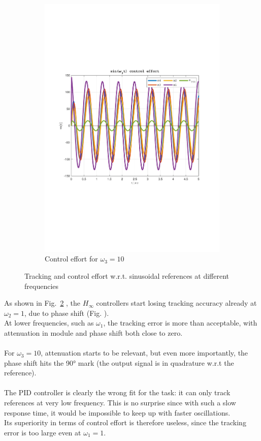 \documentclass[a4paper, 12pt]{article}
\begin{document}
\begin{figure}[h!]
\begin{subfigure}[t]{0.4\textwidth}
           \includegraphics[width=\textwidth]{Figures/fig07f.pdf}
           \caption{Control effort for $\omega_3 = 10$}
           \label{fig:fig07f}
       \end{subfigure}
       \caption{Tracking and control effort w.r.t. sinusoidal references at different frequencies}
    \label{fig:fig07}
   \end{figure}

\clearpage
As shown in Fig.~\ref{fig:fig07} , the $H_\infty$ controllers start losing tracking accuracy already at $\omega_2 = 1$, due to phase shift (Fig. ). 
\\At lower frequencies, such as $\omega_1$, the tracking error is more than acceptable, with attenuation in module and phase shift both close to zero.\\\\
For $\omega_3 = 10$, attenuation starts to be relevant, but even more importantly, the phase shift hits the 90° mark (the output signal is in quadrature w.r.t the reference).
\\\\
The PID controller is clearly the wrong fit for the task: it can only track references at very low frequency. This is no surprise since with such a slow response time, it would be impossible to keep up with faster oscillations.\\
Its superiority in terms of control effort is therefore useless, since the tracking error is too large even at $\omega_1 = 1$.
\end{document}
